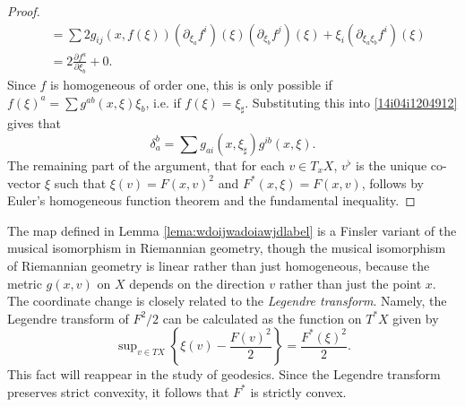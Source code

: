 \begin{proof}
\begin{equation}
\begin{split}
    &= \sum 2 g_{ij}(x,f(\xi)) (\partial_{\xi_a} f^i)(\xi) (\partial_{\xi_b} f^j)(\xi) + \xi_i (\partial_{\xi_a \xi_b} f^i)(\xi)\\
    &= 2 \frac{\partial f^a}{\partial \xi_b} + 0.
  \end{split}
  \end{equation}
  Since $f$ is homogeneous of order one, this is only possible if $f(\xi)^a = \sum g^{ab}(x,\xi) \xi_b$, i.e. if $f(\xi) = \xi_\sharp$. Substituting this into \eqref{14i04i1204912} gives that
  \begin{equation}
    \delta_a^b = \sum g_{ai}(x,\xi_\sharp) g^{ib}(x,\xi).
  \end{equation}
  The remaining part of the argument, that for each $v \in T_x X$, $v^\flat$ is the unique co-vector $\xi$ such that $\xi(v) = F(x,v)^2$ and $F^*(x,\xi) = F(x,v)$, follows by Euler's homogeneous function theorem and the fundamental inequality. \qedhere


\end{proof}

The map defined in Lemma \ref{lema:wdoijwadoiawjdlabel} is a Finsler variant of the musical isomorphism in Riemannian geometry, though the musical isomorphism of Riemannian geometry is linear rather than just homogeneous, because the metric $g(x,v)$ on $X$ depends on the direction $v$ rather than just the point $x$. The coordinate change is closely related to the \emph{Legendre transform}. Namely, the Legendre transform of $F^2/2$ can be calculated as the function on $T^* X$ given by
\begin{equation} \label{ioawjdiowajdiowa213123}
  \sup\nolimits_{v \in T X} \left\{ \xi(v) - \frac{F(v)^2}{2} \right\} = \frac{F^*(\xi)^2}{2}.
\end{equation}
%
This fact will reappear in the study of geodesics. Since the Legendre transform preserves strict convexity, it follows that $F^*$ is strictly convex.

